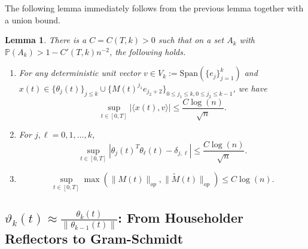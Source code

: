 \documentclass{amsart}
\newtheorem{lm}[thm]{Lemma}
\numberwithin{equation}{section}
\newcommand{\pr}{\mathbb{P}}
\newcommand{\la}{\langle}
\newcommand{\ra}{\rangle}
\begin{document}
The following lemma immediately follows from the previous lemma together with a union bound.
\begin{lm}\label{Concentration for specific functionals of theta}
    There is a $C=C(T,k)>0$ such that on a set $A_k$ with $\pr(A_k)>1-C'(T,k)n^{-2}$, the following holds. 
    \begin{enumerate}
        \item For any deterministic unit vector $v \in V_{k}:=\mathrm{Span}(\{e_j\}_{j=1}^k)$ and $x(t) \in \{\theta_j(t)\}_{j\leq k} \cup\{M(t)^{j_1}e_{j_2+2}\}_{0 \leq j_1 \leq k, 0 \leq j_2 \leq k-1}$, we have
    \begin{equation}
        \sup_{t \in [0,T]} |\la x(t),v \ra| \leq \frac{C\log(n)}{\sqrt{n}}.
        \label{Single Component bound}
    \end{equation}
    \item For $j, \ell =0,1,\dots,k$,
    \begin{equation}
        \sup_{t \in [0,T]} |\theta_j(t)^T\theta_{\ell}(t)-\delta_{j,\ell}| \leq \frac{C\log(n)}{\sqrt{n}}.
        \label{inner product concentration}
    \end{equation}
    \item 
    \begin{equation}
        \sup_{t \in [0,T]} \max(\|M(t)\|_{op},\|\tilde{M}(t)\|_{op}) \leq C\log(n).
    \end{equation}
    \end{enumerate}
\end{lm}

\subsection{$\vartheta_k(t) \approx \frac{\theta_k(t)}{\|\theta_{k-1}(t)\|}$: From Householder Reflectors to Gram-Schmidt}
\end{document}
